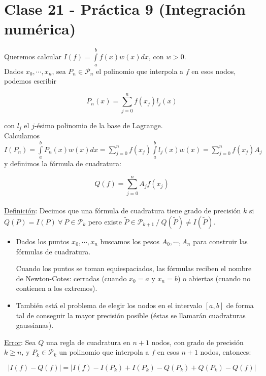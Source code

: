 \section{Clase 21 - Pr\'actica 9 (Integraci\'on num\'erica)}

Queremos calcular $I(f) = \int \limits_{a}^{b} f(x)w(x)dx$, con $w > 0$.\\

Dados $x_{0}, \cdots, x_{n}$, sea $P_{n} \in \mathcal{P}_{n}$ el polinomio que interpola a $f$ en esos nodos, podemos escribir

$$P_{n}(x) = \sum \limits_{j = 0}^{n} f(x_{j})l_{j}(x)$$

con $l_{j}$ el $j$-\'esimo polinomio de la base de Lagrange.\\

Calculamos $I(P_{n}) = \int \limits_{a}^{b} P_{n}(x)w(x)dx = \sum \limits_{j = 0}^{n} f(x_{j})\int \limits_{a}^{b} l_{j}(x)w(x) = \sum \limits_{j = 0}^{n} f(x_{j})A_{j}$ y definimos la f\'ormula de cuadratura:

$$Q(f) = \sum \limits_{j = 0}^{n} A_{j}f(x_{j})$$\\

\underline{Definici\'on}: Decimos que una f\'ormula de cuadratura tiene grado de precisi\'on $k$ si $Q(P) = I(P)\ \forall \ P \in \mathcal{P}_{k}$ pero existe $\tilde{P} \in \mathcal{P}_{k + 1}\ / \ Q(\tilde{P}) \neq I(\tilde{P})$.\\

\begin{itemize}
	\item Dados los puntos $x_{0}, \cdots, x_{n}$ buscamos los pesos $A_{0}, \cdots, A_{n}$ para construir las f\'ormulas de cuadratura.
	
	Cuando los puntos se toman equiespaciados, las f\'ormulas reciben el nombre de Newton-Cotes: cerradas (cuando $x_{0} = a$ y $x_{n} = b$) o abiertas (cuando no contienen a los extremos).
	
	\item Tambi\'en est\'a el problema de elegir los nodos en el intervalo $[a, b]$ de forma tal de conseguir la mayor precisi\'on posible (\'estas se llamar\'an cuadraturas gaussianas).
\end{itemize}

\underline{Error}: Sea $Q$ una regla de cuadratura en $n + 1$ nodos, con grado de precisi\'on $k \geq n$, y $P_{k} \in \mathcal{P}_{k}$ un polinomio que interpola a $f$ en esos $n + 1$ nodos, entonces:

$$|I(f) - Q(f)| = |I(f) - I(P_{k}) + I(P_{k}) - Q(P_{k}) + Q(P_{k}) - Q(f)|$$\\

